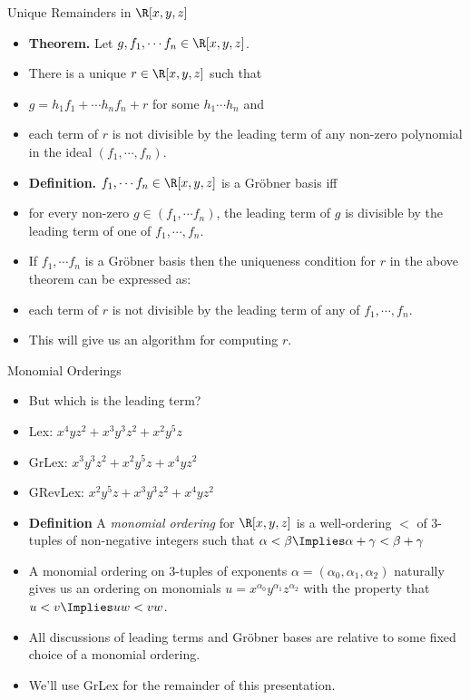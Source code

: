 \documentclass{beamer}
\begin{document}
\begin{frame}{Unique Remainders in $\R[x,y,z]$}

\begin{itemize}
  \item \textbf{Theorem.} Let $g, f_1,\cdots f_n \in \R[x,y,z]$.
  \item There is a unique $r\in\R[x,y,z]$ such that
  \item $g = h_1 f_1 + \cdots h_n f_n + r$ for some $h_1\cdots h_n$ and
  \item each term of $r$ is not divisible by the leading term of any non-zero polynomial in the ideal $(f_1,\cdots,f_n)$.
  \item \textbf{Definition.} $f_1,\cdots f_n \in \R[x,y,z]$ is a Gr\"{o}bner basis iff
  \item for every non-zero $g\in (f_1,\cdots f_n)$, the leading term of $g$ is divisible
  by the leading term of one of $f_1,\cdots,f_n$.
  \item If $f_1,\cdots f_n$ is a Gr\"{o}bner basis then the uniqueness condition for $r$ in the above theorem can be expressed as:
  \item each term of $r$ is not divisible by the leading term of any of $f_1,\cdots,f_n$.
  \item This will give us an algorithm for computing $r$.
\end{itemize}

\end{frame}


\begin{frame}{Monomial Orderings}

\begin{itemize}
  \item But which is the leading term?
  \item Lex: $x^4yz^2 + x^3y^3z^2 + x^2y^5z$
  \item GrLex: $x^3y^3z^2 + x^2y^5z + x^4yz^2$
  \item GRevLex: $x^2y^5z +x^3y^3z^2 +  x^4yz^2$
  \item \textbf{Definition} A \emph{monomial ordering} for $\R[x,y,z]$ is a
  well-ordering $<$ of 3-tuples of non-negative integers such that $\alpha < \beta \Implies \alpha + \gamma < \beta + \gamma$
  \item A monomial ordering on 3-tuples of exponents $\alpha=(\alpha_0,\alpha_1,\alpha_2)$ naturally gives us an ordering on
  monomials $u = x^{\alpha_0}y^{\alpha_1}z^{\alpha_2}$ with the property that $u<v \Implies uw < vw$.
  \item All discussions of leading terms and Gr\"{o}bner bases are relative to some fixed choice of a monomial ordering.
  \item We'll use GrLex for the remainder of this presentation.
\end{itemize}

\end{frame}
\end{document}
